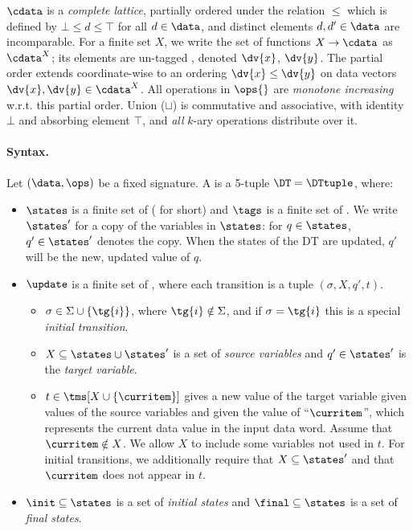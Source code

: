 $\cdata$ is a \emph{complete lattice}, partially ordered under the
relation $\le$ which is defined by $\bot \le d \le \top$ for all $d \in \data$,
and distinct elements $d, d' \in \data$ are incomparable.
For a finite set $X$, we write the set of functions $X \to \cdata$ as $\cdata^X$; its elements are un-tagged , denoted $\dv{x}$, $\dv{y}$.
The partial order extends coordinate-wise to an ordering $\dv{x} \le \dv{y}$ on data vectors $\dv{x}, \dv{y} \in \cdata^X$.
All operations in $\ops{}$ are \emph{monotone increasing}
w.r.t. this partial order.
Union ($\sqcup$) is commutative and associative, with identity $\bot$ and absorbing element $\top$,
and \emph{all} $k$-ary operations distribute over it.


\paragraph*{Syntax.}
Let $(\data, \ops)$ be a fixed signature.
A  is a 5-tuple $\DT = \DTtuple$, where:
\begin{itemize}
\item $\states$ is a finite set of  ( for short) and $\tags$ is a finite set of .
We write $\states'$ for a copy of the variables in $\states$: for $q \in \states$, $q' \in \states'$ denotes the copy. When the states of the DT are updated, $q'$ will be the new, updated value of $q$.
\item $\update$ is a finite set of ,
where each transition is a tuple $(\sigma, X, q', t)$.
\begin{itemize}
\item $\sigma \in \Sigma \cup \{\tg{i}\}$,
where $\tg{i} \notin \Sigma$, and if $\sigma = \tg{i}$ this is a special \emph{initial transition}.
\item $X \subseteq \states \cup \states'$ is a set of
\emph{source variables} and $q' \in \states'$ is the \emph{target variable}.
\item $t \in \tms[X \cup \{\curritem\}]$ gives a new value of the target variable given values of the source variables
and given the value of ``$\curritem$'', which represents the current data value in the input data word.
Assume that $\curritem \notin X$.
We allow $X$ to include some variables not used in $t$.
For initial transitions, we additionally require that $X \subseteq \states'$ and that $\curritem$ does not appear in $t$.
\end{itemize}
\item $\init \subseteq \states$ is a set of \emph{initial states} and $\final \subseteq \states$ is a set of \emph{final states}.
\end{itemize}


